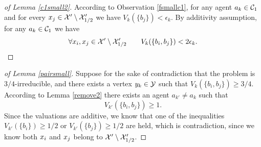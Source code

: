 \begin{proof}[of Lemma \ref{c1small2}]
According to Observation \ref{fsmallc1}, for any agent $a_k \in \mathcal{C}_1$ and for every $x_j \in \mathcal{X}' \setminus \mathcal{X}'_{1/2}$ we have $V_k(\{b_j\}) < \epsilon_k$. By additivity assumption, for any $a_k \in \mathcal{C}_1$  we have 
$$ \forall {x_i, x_j \in \mathcal{X}' \setminus \mathcal{X}'_{1/2}} \qquad V_k(\{b_i, b_j\}) < 2\epsilon_k.$$
\end{proof}

\begin{proof}[of Lemma \ref{pairsmall}]
Suppose for the sake of contradiction that the problem is $3/4$-irreducible, and there exists a vertex $y_k \in \mathcal{Y}$ such that $V_k(\{b_i, b_j\}) \geq 3/4$. According to Lemma \ref{remove2} there exists an agent $a_{k'} \neq a_k$ such that $$V_{k'}(\{b_i, b_j\}) \geq 1.$$
Since the valuations are additive, we know that one of the inequalities $V_{k'}(\{b_i\}) \geq 1/2$ or $V_{k'}(\{b_j\}) \geq 1/2$ are held, which is contradiction, since we know both $x_i$ and $x_j$ belong to $\mathcal{X}' \setminus \mathcal{X}'_{1/2}$.
\end{proof}

